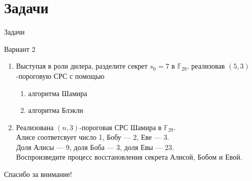 \documentclass{beamer}
\begin{document}
\section{Задачи}
\begin{frame}{Задачи}
    \begin{center}
        Вариант 2
    \end{center}
    \begin{enumerate}
        \item Выступая в роли дилера, разделите секрет \(s_0 = 7\) в \(\mathbb{F}_{29}\), реализовав \((5, 3)\)-пороговую СРС с помощью
        \begin{enumerate}
            \item алгоритма Шамира
            \item алгоритма Блэкли
        \end{enumerate}
        \item Реализована \((n, 3)\)-пороговая СРС Шамира в \(\mathbb{F}_{29}\). \\
        Алисе соответсвует число 1, Бобу --- 2, Еве --- 3. \\
        Доля Алисы --- 9, доля Боба --- 3, доля Евы --- 23. \\
        Воспроизведите процесс восстановления секрета Алисой, Бобом и Евой.
    \end{enumerate}
\end{frame}

\begin{frame}
    \centering
    \Huge Спасибо за внимание!
\end{frame}
\end{document}
